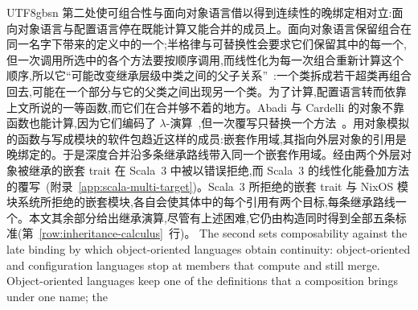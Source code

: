 \begin{CJK*}{UTF8}{gbsn}
\ifPaperChinese
第二处使可组合性与面向对象语言借以得到连续性的晚绑定相对立:面向对象语言与配置语言停在既能计算又能合并的成员上。面向对象语言保留组合在同一名字下带来的定义中的一个;半格律与可替换性会要求它们保留其中的每一个,但一次调用所选中的各个方法要按顺序调用,而线性化为每一次组合重新计算这个顺序,所以它``可能改变继承层级中类之间的父子关系''~\cite{scharli2003-traits}:一个类拆成若干超类再组合回去,可能在一个部分与它的父类之间出现另一个类。为了计算,配置语言转而依靠上文所说的一等函数,而它们在合并够不着的地方。Abadi 与 Cardelli 的对象不靠函数也能计算,因为它们编码了 $\lambda$-演算~\cite[\S~2.2]{abadi1994-primitive-objects},但一次覆写只替换一个方法~\cite{abadi1996-theory-of-objects}。用对象模拟的函数与写成模块的软件包趋近这样的成员:嵌套作用域,其指向外层对象的引用是晚绑定的。于是深度合并沿多条继承路线带入同一个嵌套作用域。经由两个外层对象被继承的嵌套 trait 在 Scala~3 中被以错误拒绝,而 Scala~3 的线性化能叠加方法的覆写~\cite[第~5~章 ``Traits'']{scala-contributors-scala3-specification}(附录~\ref{app:scala-multi-target})。Scala~3 所拒绝的嵌套 trait 与 NixOS 模块系统所拒绝的嵌套模块,各自会使其体中的每个引用有两个目标,每条继承路线一个。本文其余部分给出继承演算,尽管有上述困难,它仍由构造同时得到全部五条标准(第~\ref{row:inheritance-calculus}~行)。
\else
The second sets composability against the late binding by which object-oriented languages
obtain continuity: object-oriented and configuration languages stop at members that compute and still
merge.
Object-oriented languages keep one of the definitions that a composition brings under one name; the

\end{CJK*}
